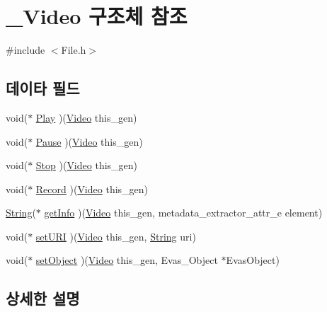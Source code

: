 \hypertarget{struct___video}{\section{\-\_\-\-Video 구조체 참조}
\label{struct___video}
}


{\ttfamily \#include $<$File.\-h$>$}

\subsection*{데이타 필드}
\begin{DoxyCompactItemize}
\item 
void($\ast$ \hyperlink{struct___video_a638d742602c39ab64bbded0f4521d106}{Play} )(\hyperlink{_file_8h_aabe6dc4fa995ed8e3f85097dd589ea6f}{Video} this\-\_\-gen)
\item 
void($\ast$ \hyperlink{struct___video_af1d96a39825d2bb1300661601fd0aa7a}{Pause} )(\hyperlink{_file_8h_aabe6dc4fa995ed8e3f85097dd589ea6f}{Video} this\-\_\-gen)
\item 
void($\ast$ \hyperlink{struct___video_ad9c252b2b06ead2f188d91339e651485}{Stop} )(\hyperlink{_file_8h_aabe6dc4fa995ed8e3f85097dd589ea6f}{Video} this\-\_\-gen)
\item 
void($\ast$ \hyperlink{struct___video_aabb39795a3af7a469d10950d2b088ce6}{Record} )(\hyperlink{_file_8h_aabe6dc4fa995ed8e3f85097dd589ea6f}{Video} this\-\_\-gen)
\item 
\hyperlink{dit_8h_a2efe6d463d80744789f228f5dc4baa39}{String}($\ast$ \hyperlink{struct___video_a28466d9896b523beacac4a1add633aa6}{get\-Info} )(\hyperlink{_file_8h_aabe6dc4fa995ed8e3f85097dd589ea6f}{Video} this\-\_\-gen, metadata\-\_\-extractor\-\_\-attr\-\_\-e element)
\item 
void($\ast$ \hyperlink{struct___video_a1b806abc2d87bcfdb8fc81eeb349062e}{set\-U\-R\-I} )(\hyperlink{_file_8h_aabe6dc4fa995ed8e3f85097dd589ea6f}{Video} this\-\_\-gen, \hyperlink{dit_8h_a2efe6d463d80744789f228f5dc4baa39}{String} uri)
\item 
void($\ast$ \hyperlink{struct___video_a1245c2a3dff66080a4c0f9fd812c25e1}{set\-Object} )(\hyperlink{_file_8h_aabe6dc4fa995ed8e3f85097dd589ea6f}{Video} this\-\_\-gen, Evas\-\_\-\-Object $\ast$Evas\-Object)
\end{DoxyCompactItemize}


\subsection{상세한 설명}


